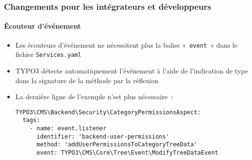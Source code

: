%

\begin{frame}[fragile]
	\frametitle{Changements pour les intégrateurs et développeurs}
	\framesubtitle{Écouteur d'événement}

	\begin{itemize}
		\item Les écouteurs d'événement ne nécessitent plus la balise «~\texttt{event}~»
			dans le fichier \texttt{Services.yaml}
		\item TYPO3 détecte automatiquement l'événement à l'aide de l'indication de type dans la signature
		    de la méthode par la réflexion
		\item La dernière ligne de l'exemple n'est plus nécessaire~:

\begin{lstlisting}
TYPO3\CMS\Backend\Security\CategoryPermissionsAspect:
  tags:
    - name: event.listener
      identifier: 'backend-user-permissions'
      method: 'addUserPermissionsToCategoryTreeData'
      event: TYPO3\CMS\Core\Tree\Event\ModifyTreeDataEvent
\end{lstlisting}

	\end{itemize}

\end{frame}

